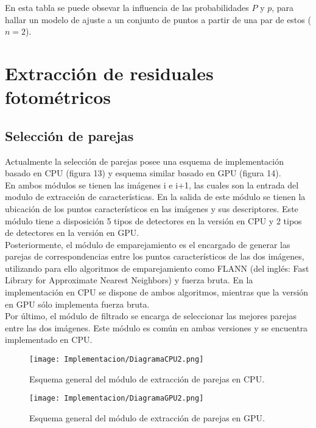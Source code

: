 En esta tabla se puede obsevar la influencia de las probabilidades $P$ y $p$, para hallar un modelo de ajuste a un conjunto de puntos a partir de una par de estos ($n = 2$).



\section{Extracción de residuales fotométricos}
\subsection{ Selección de parejas }

Actualmente la selección de parejas posee una esquema de  implementación basado en  CPU (figura 13) y  esquema similar basado en GPU (figura 14).\\

En ambos módulos se tienen las imágenes i e i+1, las cuales son la entrada del modulo de extracción de características.
En la salida de este módulo se tienen la ubicación de los puntos característicos en las imágenes y sus descriptores. Este módulo tiene a disposición 5 tipos de detectores en la versión en CPU y 2 tipos de detectores en la versión en GPU.\\

Posteriormente, el módulo de emparejamiento es el encargado de generar las parejas de correspondencias entre los puntos característicos de las dos imágenes, utilizando para ello algoritmos de emparejamiento como FLANN (del inglés: Fast Library for Approximate Nearest Neighbors)
y fuerza bruta. En la implementación en CPU se dispone de ambos algoritmos, mientras que la versión en GPU sólo implementa fuerza bruta.\\

Por último, el módulo de filtrado se encarga de seleccionar las mejores parejas entre las dos imágenes.  Este módulo es común en ambas versiones y se encuentra implementado en CPU.\\

\begin{figure}[H]
	\centering
	\texttt{[image: Implementacion/DiagramaCPU2.png]}
	\caption{Esquema general del módulo de extracción de parejas en CPU.}
	\label{fig:my_label}
\end{figure}


\begin{figure}[H]
	\centering
	\texttt{[image: Implementacion/DiagramaGPU2.png]}
	\caption{Esquema general del módulo de extracción de parejas en GPU.}
	\label{fig:my_label}
\end{figure}

